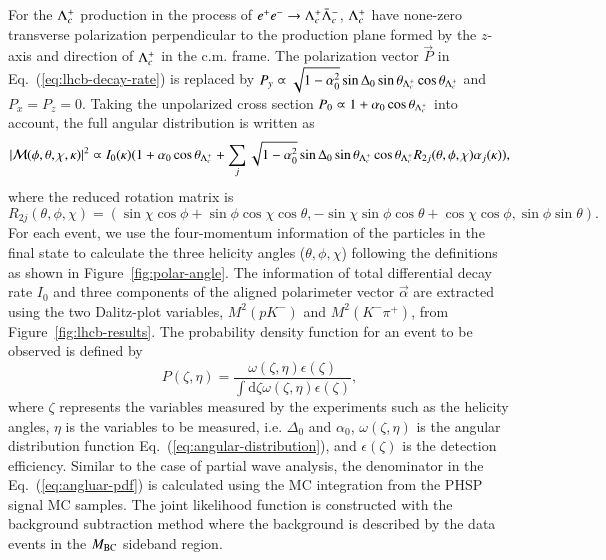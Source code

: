 For the $\Lambda_{c}^{+}$ production in the process of $e^+e^-\rightarrow\Lambda_{c}^{+}\bar{\Lambda}_{c}^{-}$, $\Lambda_{c}^{+}$ have none-zero transverse polarization perpendicular to the production plane formed by the $z$-axis and direction of $\Lambda_{c}^{+}$ in the c.m. frame. The polarization vector $\vec{P}$ in Eq.~(\ref{eq:lhcb-decay-rate}) is replaced by $P_y \varpropto \sqrt{1-\alpha_0^2}\sin\Delta_0\sin\theta_{\Lambda_{c}^{+}}\cos\theta_{\Lambda_{c}^{+}}$ and $P_x = P_z = 0$. Taking the unpolarized cross section $P_0 \varpropto 1 + \alpha_0\cos\theta_{\Lambda_{c}^{+}}$ into account, the full angular distribution is written as
\begin{equation}\label{eq:angular-distribution}
    |\mathcal{M}(\phi,\theta,\chi,\kappa)|^2 \varpropto I_0(\kappa)(1+\alpha_0\cos\theta_{\Lambda_{c}^{+}} + \sum_{j}\sqrt{1-\alpha_0^2}\sin\Delta_0\sin\theta_{\Lambda_{c}^{+}}\cos\theta_{\Lambda_{c}^{+}}R_{2j}(\theta, \phi, \chi)\alpha_j(\kappa)),
\end{equation}
where the reduced rotation matrix is
\begin{equation}
R_{2j}(\theta,\phi,\chi) = (\sin\chi\cos\phi+\sin\phi\cos\chi\cos\theta, -\sin\chi\sin\phi\cos\theta+\cos\chi\cos\phi, \sin\phi\sin\theta).
\end{equation}
For each event, we use the four-momentum information of the particles in the final state to calculate the three helicity angles ($\theta,\phi, \chi$) following the definitions as shown in Figure~\ref{fig:polar-angle}. The information of total differential decay rate $I_0$ and three components of the aligned polarimeter vector $\vec{\alpha}$ are extracted using the two Dalitz-plot variables, $M^2(pK^-)$ and $M^2(K^-\pi^+)$, from Figure~\ref{fig:lhcb-results}. The probability density function for an event to be observed is defined by
\begin{equation}\label{eq:angluar-pdf}
    P(\zeta,\eta) = \frac{\omega(\zeta, \eta)\epsilon(\zeta)}{\int\mathrm{d}\zeta\omega(\zeta,\eta)\epsilon(\zeta)},
\end{equation}
where $\zeta$ represents the variables measured by the experiments such as the helicity angles, $\eta$ is the variables to be measured, i.e. $\Delta_0$ and $\alpha_0$, $\omega(\zeta, \eta)$ is the angular distribution function Eq.~(\ref{eq:angular-distribution}), and $\epsilon(\zeta)$ is the detection efficiency. Similar to the case of partial wave analysis, the denominator in the Eq.~(\ref{eq:angluar-pdf}) is calculated using the MC integration from the PHSP signal MC samples. The joint likelihood function is constructed with the background subtraction method where the background is described by the data events in the $M_{\rm{BC}}$ sideband region. 


